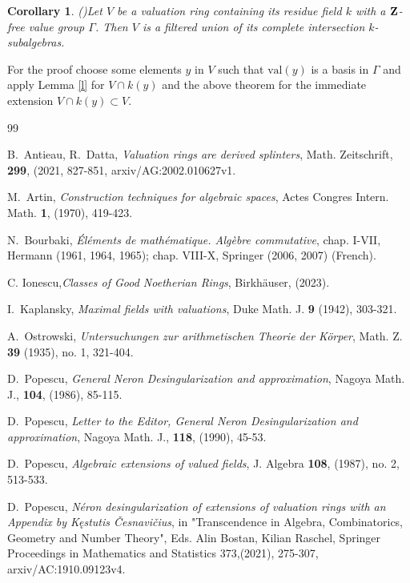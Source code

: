 \documentclass[12pt]{amsart}
\newtheorem{Corollary}[Theorem]{Corollary}
\theoremstyle{definition}
\theoremstyle{subsection-tweak}
\theoremstyle{theorem}
\theoremstyle{definition}
\newcommand{\val}{\mathrm{val}}		%
\begin{document}
\begin{Corollary} (\cite[Corollary 7] {P3})Let $V$ be a  valuation ring containing its residue field $k$   with a $\bf Z$-free value group $\Gamma$. 
 Then $V$ is a filtered  union of its complete intersection $k$-subalgebras. 
\end{Corollary}
For the proof choose  some elements $y$ in $V$ such that $\val(y)$ is a basis in $\Gamma$  and apply Lemma \ref{l}   for $V\cap k(y) $ and the above theorem for the immediate extension $V\cap k(y)\subset V$.

 

\begin{thebibliography}{99}
\normalsize{



 B.\  Antieau, R.\ Datta, {\em Valuation rings are derived splinters}, Math. Zeitschrift, {\bf 299}, (2021, 827-851,  arxiv/AG:2002.010627v1.

 M.\ Artin,  {\em Construction techniques for algebraic spaces}, Actes Congres Intern. Math. {\bf 1}, (1970), 419-423.




   N.\ Bourbaki,  {\em \'El\'ements de math\'ematique. Alg\`ebre commutative}, chap. I-VII, Hermann (1961, 1964,
1965); chap. VIII-X, Springer (2006, 2007) (French).


 C. Ionescu,{\em Classes of Good Noetherian Rings}, Birkh\"auser, (2023).




 I.\ Kaplansky, {\em Maximal fields with valuations}, Duke Math. J. {\bf 9} (1942), 303-321.







 A.\  Ostrowski, {\em Untersuchungen zur arithmetischen Theorie der K\"orper}, Math. Z. {\bf39} (1935), no. 1,
321-404.

  D.\ Popescu, {\em General Neron Desingularization and approximation}, Nagoya Math. J., {\bf 104}, (1986), 85-115.
 
 D.\ Popescu, {\em Letter to the Editor, General Neron Desingularization and approximation}, Nagoya Math. J., {\bf 118}, (1990), 45-53.
 



  D.\ Popescu, {\em Algebraic extensions of valued fields}, J. Algebra {\bf 108}, (1987), no. 2,
513-533.

  D.\ Popescu, {\em N\'eron desingularization of extensions of valuation rings with an Appendix by K\k{e}stutis \v{C}esnavi\v{c}ius}, in   "Transcendence in Algebra, Combinatorics, Geometry and Number Theory",  Eds. Alin Bostan, Kilian
Raschel, Springer Proceedings in Mathematics and Statistics 373,(2021), 275-307, 
   arxiv/AC:1910.09123v4.
   
}
\end{thebibliography}
\end{document}

